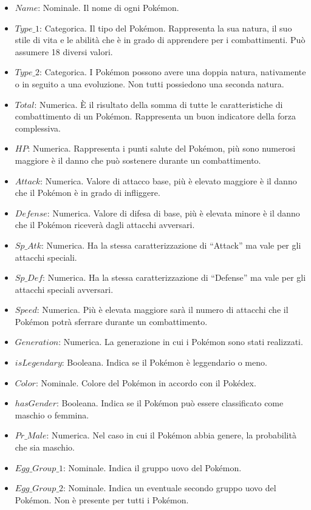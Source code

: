 \documentclass[fleqn,10pt]{SelfArx} %
\begin{document}
\begin{itemize}
\item $Name$: Nominale. Il nome di ogni Pokémon.
\item $Type\_1$: Categorica. Il tipo del Pokémon. Rappresenta la sua natura, il suo stile di vita e le abilità che è in grado di apprendere per i combattimenti. Può assumere 18 diversi valori.
\item $Type\_2$: Categorica. I Pokémon possono avere una doppia natura, nativamente o in seguito a una evoluzione. Non tutti possiedono una seconda natura.
\item $Total$: Numerica. \`E il risultato della somma di tutte le caratteristiche di combattimento di un Pokémon. Rappresenta un buon indicatore della forza complessiva.
\item $HP$: Numerica. Rappresenta i punti salute del Pokémon, più sono numerosi maggiore è il danno che può sostenere durante un combattimento.
\item $Attack$: Numerica. Valore di attacco base, più è elevato maggiore è il danno che il Pokémon è in grado di infliggere.
\item $Defense$: Numerica. Valore di difesa di base, più è elevata minore è il danno che il Pokémon riceverà dagli attacchi avversari.
\item $Sp\_Atk$: Numerica. Ha la stessa caratterizzazione di “Attack” ma vale per gli attacchi speciali.
\item $Sp\_Def$: Numerica. Ha la stessa caratterizzazione di “Defense” ma vale per gli attacchi speciali avversari.
\item $Speed$: Numerica. Più è elevata maggiore sarà il numero di attacchi che il Pokémon potrà sferrare durante un combattimento.
\item $Generation$: Numerica. La generazione in cui i Pokémon sono stati realizzati.
\item $isLegendary$: Booleana. Indica se il Pokémon è leggendario o meno.
\item $Color$: Nominale. Colore del Pokémon in accordo con il Pokédex.
\item $hasGender$: Booleana. Indica se il Pokémon può essere classificato come maschio o femmina.
\item $Pr\_Male$: Numerica. Nel caso in cui il Pokémon abbia genere, la probabilità che sia maschio.
\item $Egg\_Group\_1$: Nominale. Indica il gruppo uovo del Pokémon.
\item $Egg\_Group\_2$: Nominale. Indica un eventuale secondo gruppo uovo del Pokémon. Non è presente per tutti i Pokémon.

\end{itemize}
\end{document}
